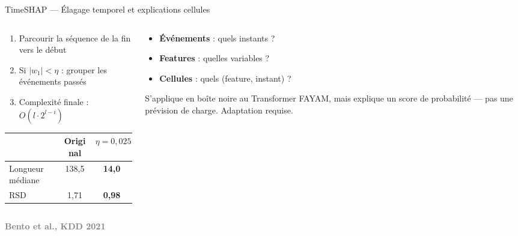 \documentclass[10pt]{beamer}
\newcommand{\source}[1]{\vspace{6pt}\hfill{\textcolor{gray}{\textbf{\tiny #1}}}}
\begin{document}
\begin{frame}{TimeSHAP --- Élagage temporel et explications cellules}
  \begin{columns}
    \begin{column}{0.569\textwidth}
    \vspace{-1.5cm}
      \begin{tcolorbox}[
        colback=orange!3, colframe=orange!50!black,
        arc=2mm, boxrule=0.5pt, fonttitle=\bfseries,
        title={Algorithme d'élagage (Alg. 1)}]
        \begin{enumerate}
          \item Parcourir la séquence de la fin vers le début
          \item Si $|w_1| < \eta$ : grouper les événements passés
          \item Complexité finale : $O(l \cdot 2^{l-i})$
        \end{enumerate}
      \end{tcolorbox}
      \begin{tcolorbox}[
        colback=blue!3, colframe=blue!40!black,
        arc=2mm, boxrule=0.5pt, fonttitle=\bfseries,
        title={Pruning Table (Table 1)}]
        \hspace{-0.5cm}
        \begin{tabular}{lcc}
          \toprule
          & \textbf{Original} & $\eta=0{,}025$ \\
          \midrule
          Longueur médiane & 138,5 & \textbf{14,0} \\
          RSD & 1,71 & \textbf{0,98} \\
          \bottomrule
        \end{tabular}
      \end{tcolorbox}
    \end{column}
    \begin{column}{0.43\textwidth}
    \vspace{-0.7cm}
      \begin{tcolorbox}[
        colback=green!3, colframe=green!40!black,
        arc=2mm, boxrule=0.5pt, fonttitle=\bfseries,
        title={3 niveaux d'explication}]
        \begin{itemize}
          \item \textbf{Événements} : quels instants ?
          \item \textbf{Features} : quelles variables ?
          \item \textbf{Cellules} : quels (feature, instant) ?
        \end{itemize}
      \end{tcolorbox}
      \begin{tcolorbox}[
        colback=red!3, colframe=red!60!black,
        arc=2mm, boxrule=0.5pt, fonttitle=\bfseries,
        title={Transposabilité à FAYAM}]
        S'applique en boîte noire au Transformer FAYAM, mais explique
        un score de probabilité --- pas une prévision de charge.
        Adaptation requise.
      \end{tcolorbox}
    \end{column}
  \end{columns}
  \source{Bento et al., KDD 2021}
\end{frame}
\end{document}
